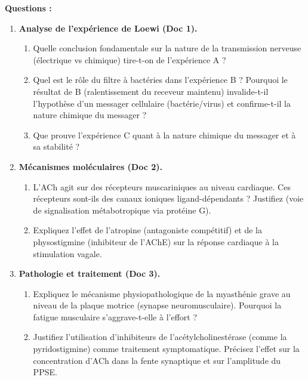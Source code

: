 \documentclass[11pt]{article}
\begin{document}
\begin{exercice}
\textbf{Questions :}
\begin{enumerate}
    \item \textbf{Analyse de l'expérience de Loewi (Doc 1).}
    \begin{enumerate}
        \item Quelle conclusion fondamentale sur la nature de la transmission nerveuse (électrique vs chimique) tire-t-on de l'expérience A ?
        \item Quel est le rôle du filtre à bactéries dans l'expérience B ? Pourquoi le résultat de B (ralentissement du receveur maintenu) invalide-t-il l'hypothèse d'un messager cellulaire (bactérie/virus) et confirme-t-il la nature chimique du messager ?
        \item Que prouve l'expérience C quant à la nature chimique du messager et à sa stabilité ?
    \end{enumerate}
    \item \textbf{Mécanismes moléculaires (Doc 2).}
    \begin{enumerate}
        \item L'ACh agit sur des récepteurs muscariniques au niveau cardiaque. Ces récepteurs sont-ils des canaux ioniques ligand-dépendants ? Justifiez (voie de signalisation métabotropique via protéine G).
        \item Expliquez l'effet de l'atropine (antagoniste compétitif) et de la physostigmine (inhibiteur de l'AChE) sur la réponse cardiaque à la stimulation vagale.
    \end{enumerate}
    \item \textbf{Pathologie et traitement (Doc 3).}
    \begin{enumerate}
        \item Expliquez le mécanisme physiopathologique de la myasthénie grave au niveau de la plaque motrice (synapse neuromusculaire). Pourquoi la fatigue musculaire s'aggrave-t-elle à l'effort ?
        \item Justifiez l'utilisation d'inhibiteurs de l'acétylcholinestérase (comme la pyridostigmine) comme traitement symptomatique. Précisez l'effet sur la concentration d'ACh dans la fente synaptique et sur l'amplitude du PPSE.
    \end{enumerate}
\end{enumerate}
\end{exercice}
\end{document}
